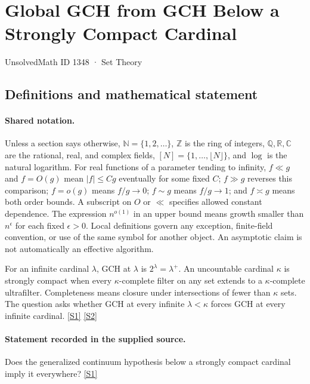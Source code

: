 \documentclass[11pt,a4paper]{article}
\newcommand{\N}{\mathbb{N}}
\newcommand{\Z}{\mathbb{Z}}
\newcommand{\Q}{\mathbb{Q}}
\newcommand{\R}{\mathbb{R}}
\newcommand{\C}{\mathbb{C}}
\newcommand{\sref}[2]{\hyperlink{source:#1:#2}{[S#2]}}
\begin{document}

\setcounter{section}{1347}

\section{Global GCH from GCH Below a Strongly Compact Cardinal}\label{1348}

{\small\sffamily UnsolvedMath ID 1348 · Set Theory}

\subsection{Definitions and mathematical statement}

\paragraph{Shared notation.}Unless a section says otherwise, $\N=\{1,2,\ldots\}$,
$\Z$ is the ring of integers, $\Q,\R,\C$ are the rational, real, and complex
fields, $[N]=\{1,\ldots,\lfloor N\rfloor\}$, and $\log$ is the natural
logarithm. For real functions of a parameter tending to infinity,
$f\ll g$ and $f=O(g)$ mean $|f|\leq Cg$ eventually for some fixed $C$;
$f\gg g$ reverses this comparison; $f=o(g)$ means $f/g\to0$;
$f\sim g$ means $f/g\to1$; and $f\asymp g$ means both order bounds.
A subscript on $O$ or $\ll$ specifies allowed constant dependence.
The expression $n^{o(1)}$ in an upper bound means growth smaller than
$n^\epsilon$ for each fixed $\epsilon>0$. Local definitions govern any
exception, finite-field convention, or use of the same symbol for another
object. An asymptotic claim is not automatically an effective algorithm.



For an infinite cardinal $\lambda$, GCH at $\lambda$ is $2^\lambda=\lambda^+$. An uncountable cardinal $\kappa$ is strongly compact when every $\kappa$-complete filter on any set extends to a $\kappa$-complete ultrafilter. Completeness means closure under intersections of fewer than $\kappa$ sets. The question asks whether GCH at every infinite $\lambda<\kappa$ forces GCH at every infinite cardinal. \sref{1348}{1} \sref{1348}{2}

\paragraph{Statement recorded in the supplied source.}
Does the generalized continuum hypothesis below a strongly compact cardinal imply it everywhere? \sref{1348}{1}
\end{document}
